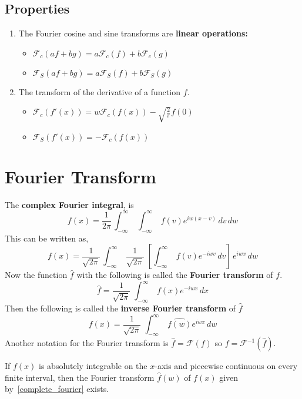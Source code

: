 \documentclass[aima331_lecturenotes_ku.tex]{subfiles}
\begin{document}
  \subsection{Properties}
  \begin{enumerate}
  \item The Fourier cosine and sine transforms are \textbf{linear operations:}
  \begin{itemize}
  \item $\mathcal{F}_c (af+bg)=a\mathcal{F}_c(f) + b \mathcal{F}_c(g)$
   \item $\mathcal{F}_S (af+bg)=a\mathcal{F}_S(f) + b \mathcal{F}_S(g)$
   \end{itemize}

 \item The transform of the derivative of a function $f$.
   \begin{itemize}
   \item $\displaystyle \mathcal{F}_c(f'(x))=w\mathcal{F}_c(f(x)) -\sqrt{\frac{2}{\pi}} f(0)$
     \vspace{2mm}
   \item $\displaystyle \mathcal{F}_S(f'(x)) = -\mathcal{F}_c(f(x))$
   \end{itemize}
 \end{enumerate}

 \section{Fourier Transform}
 The \textbf{complex Fourier integral}, is
 \begin{equation}
   \label{complex_fourier_integral}
   f(x)=\frac{1}{2\pi} \, \int_{-\infty}^{\infty}\;\int_{-\infty}^{\infty} \; f(v) e^{iw(x-v)}\,dv\,dw
 \end{equation}
 This can be written as,
 \begin{equation*}
   \label{complex_fourier_integral1}
   f(x)=\frac{1}{\sqrt{2\pi}} \, \int_{-\infty}^{\infty}\;\frac{1}{\sqrt{2\pi}} \; \left [\int_{-\infty}^{\infty} \; f(v) e^{-iwv}\,dv \right ] \,e^{iwx} \,dw
 \end{equation*}
 Now the function $\hat{f}$ with the following is called the \textbf{Fourier transform} of $f$.
 \begin{equation}
   \label{eq:1}
   \hat{f} = \frac{1}{\sqrt{2\pi}} \; \int_{-\infty}^{\infty} \; f(x) e^{-iwx}\,dx
 \end{equation}
 Then the following is called the \textbf{inverse Fourier transform} of $\hat{f}$
 \begin{equation}
   \label{complete_fourier}
   f(x) =\frac{1}{\sqrt{2\pi}}\; \int_{-\infty}^{\infty} \; \hat{f(w)} e^{iwx}\,dw
 \end{equation}
 Another notation for the Fourier transform is $\hat{f}=\mathcal{F}(f)$ so $f=\mathcal{F}^{-1}(\hat{f})$.
 \begin{theorem}
   If $f(x)$ is absolutely integrable on the $x$-axis and piecewise continuous on every finite interval, then the Fourier transform $\hat{f}(w)$ of $f(x)$ given by~\ref{complete_fourier} exists.
 \end{theorem}
\end{document}
